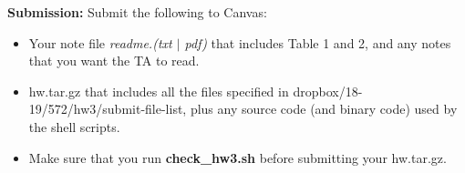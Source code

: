 \documentclass[11pt]{article}
\begin{document}
\vspace{0.5 in}
\hspace{-0.3in}
{\bf Submission:} Submit the following to Canvas:

\begin{itemize}
  \item Your note file {\it readme.(txt $\mid$ pdf)}
      that includes Table 1 and 2, 
      and any notes that you want the TA to read.
      

  \item  hw.tar.gz that includes all the files specified in
      dropbox/18-19/572/hw3/submit-file-list, plus any source code
      (and binary code) used by the shell scripts.

  \item Make sure that you run {\bf check\_hw3.sh} before
       submitting your hw.tar.gz.
        
    
\end{itemize}
\end{document}
